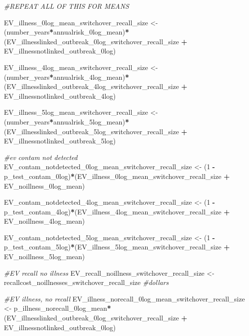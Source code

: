 \documentclass[
]{article}
\newenvironment{Shaded}{\begin{snugshade}}{\end{snugshade}}
\newcommand{\CommentTok}[1]{\textcolor[rgb]{0.56,0.35,0.01}{\textit{#1}}}
\newcommand{\DecValTok}[1]{\textcolor[rgb]{0.00,0.00,0.81}{#1}}
\newcommand{\NormalTok}[1]{#1}
\newcommand{\OtherTok}[1]{\textcolor[rgb]{0.56,0.35,0.01}{#1}}
\newcommand{\SpecialCharTok}[1]{\textcolor[rgb]{0.81,0.36,0.00}{\textbf{#1}}}
\begin{document}
\begin{Shaded}
\begin{Highlighting}[]
\CommentTok{\#REPEAT ALL OF THIS FOR MEANS}

\NormalTok{EV\_illness\_0log\_mean\_switchover\_recall\_size }\OtherTok{\textless{}{-}}\NormalTok{ (number\_years}\SpecialCharTok{*}\NormalTok{annualrisk\_0log\_mean)}\SpecialCharTok{*}\NormalTok{(EV\_illnesslinked\_outbreak\_0log\_switchover\_recall\_size }\SpecialCharTok{+}\NormalTok{ EV\_illnessnotlinked\_outbreak\_0log)}

\NormalTok{EV\_illness\_4log\_mean\_switchover\_recall\_size }\OtherTok{\textless{}{-}}\NormalTok{ (number\_years}\SpecialCharTok{*}\NormalTok{annualrisk\_4log\_mean)}\SpecialCharTok{*}\NormalTok{(EV\_illnesslinked\_outbreak\_4log\_switchover\_recall\_size }\SpecialCharTok{+}\NormalTok{ EV\_illnessnotlinked\_outbreak\_4log)}

\NormalTok{EV\_illness\_5log\_mean\_switchover\_recall\_size }\OtherTok{\textless{}{-}}\NormalTok{ (number\_years}\SpecialCharTok{*}\NormalTok{annualrisk\_5log\_mean)}\SpecialCharTok{*}\NormalTok{(EV\_illnesslinked\_outbreak\_5log\_switchover\_recall\_size }\SpecialCharTok{+}\NormalTok{ EV\_illnessnotlinked\_outbreak\_5log)}


\CommentTok{\#ev contam not detected}
\NormalTok{EV\_contam\_notdetected\_0log\_mean\_switchover\_recall\_size }\OtherTok{\textless{}{-}}\NormalTok{ (}\DecValTok{1} \SpecialCharTok{{-}}\NormalTok{ p\_test\_contam\_0log)}\SpecialCharTok{*}\NormalTok{(EV\_illness\_0log\_mean\_switchover\_recall\_size }\SpecialCharTok{+}\NormalTok{ EV\_noillness\_0log\_mean)}

\NormalTok{EV\_contam\_notdetected\_4log\_mean\_switchover\_recall\_size }\OtherTok{\textless{}{-}}\NormalTok{ (}\DecValTok{1} \SpecialCharTok{{-}}\NormalTok{ p\_test\_contam\_4log)}\SpecialCharTok{*}\NormalTok{(EV\_illness\_4log\_mean\_switchover\_recall\_size }\SpecialCharTok{+}\NormalTok{ EV\_noillness\_4log\_mean)}

\NormalTok{EV\_contam\_notdetected\_5log\_mean\_switchover\_recall\_size }\OtherTok{\textless{}{-}}\NormalTok{ (}\DecValTok{1} \SpecialCharTok{{-}}\NormalTok{ p\_test\_contam\_5log)}\SpecialCharTok{*}\NormalTok{(EV\_illness\_5log\_mean\_switchover\_recall\_size }\SpecialCharTok{+}\NormalTok{ EV\_noillness\_5log\_mean)}


\CommentTok{\#EV recall no illness}
\NormalTok{EV\_recall\_noillness\_switchover\_recall\_size }\OtherTok{\textless{}{-}}\NormalTok{ recallcost\_noillnesses\_switchover\_recall\_size }\CommentTok{\#dollars}


\CommentTok{\#EV illness, no recall}
\NormalTok{EV\_illness\_norecall\_0log\_mean\_switchover\_recall\_size }\OtherTok{\textless{}{-}}\NormalTok{ p\_illness\_norecall\_0log\_mean}\SpecialCharTok{*}\NormalTok{(EV\_illnesslinked\_outbreak\_0log\_switchover\_recall\_size }\SpecialCharTok{+}\NormalTok{ EV\_illnessnotlinked\_outbreak\_0log)}


\end{Highlighting}
\end{Shaded}
\end{document}
